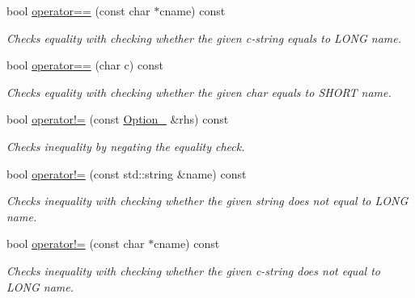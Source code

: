 \begin{DoxyCompactItemize}
    bool \mbox{\hyperlink{class_info_parse_1_1_option___a6a69c8e4d4bda3e88b2f5abbaa6dc80c}{operator==}} (const char $\ast$cname) const
    \begin{DoxyCompactList}
        \small\item\em Checks equality with checking whether the given c-\/string equals to L\+O\+NG name.
    \end{DoxyCompactList}\item
    \mbox{\label{class_info_parse_1_1_option___ad037f2c39e1713a0d761b23837fca79b}}
    bool \mbox{\hyperlink{class_info_parse_1_1_option___ad037f2c39e1713a0d761b23837fca79b}{operator==}} (char c) const
    \begin{DoxyCompactList}
        \small\item\em Checks equality with checking whether the given char equals to S\+H\+O\+RT name.
    \end{DoxyCompactList}\item
    bool \mbox{\hyperlink{class_info_parse_1_1_option___a4b8f64ccc99c927b0c28cd5e58bfc54b}{operator!=}} (const \mbox{\hyperlink{class_info_parse_1_1_option__}{Option\+\_\+}} \&rhs) const
    \begin{DoxyCompactList}
        \small\item\em Checks inequality by negating the equality check.
    \end{DoxyCompactList}\item
    \mbox{\label{class_info_parse_1_1_option___a66fb46853cb1ee5a66da81391eec1019}}
    bool \mbox{\hyperlink{class_info_parse_1_1_option___a66fb46853cb1ee5a66da81391eec1019}{operator!=}} (const std\+::string \&name) const
    \begin{DoxyCompactList}
        \small\item\em Checks inequality with checking whether the given string does not equal to L\+O\+NG name.
    \end{DoxyCompactList}\item
    \mbox{\label{class_info_parse_1_1_option___a7b046bac42198649efd752d101ec3a51}}
    bool \mbox{\hyperlink{class_info_parse_1_1_option___a7b046bac42198649efd752d101ec3a51}{operator!=}} (const char $\ast$cname) const
    \begin{DoxyCompactList}
        \small\item\em Checks inequality with checking whether the given c-\/string does not equal to L\+O\+NG name.

\end{DoxyCompactList}
\end{DoxyCompactItemize}
